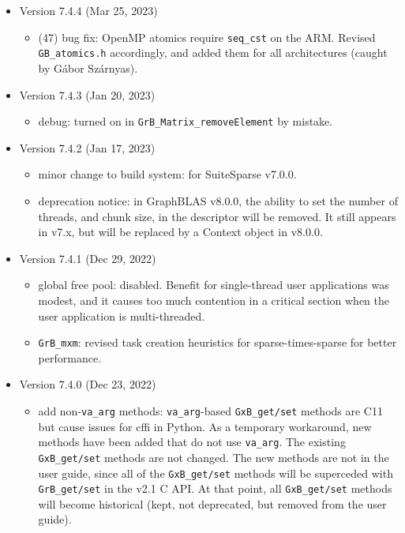 \begin{itemize}
\item Version 7.4.4 (Mar 25, 2023)

    \begin{itemize}
    \item (47) bug fix: OpenMP atomics require \verb'seq_cst' on the ARM.
        Revised \verb'GB_atomics.h' accordingly, and added them for all
        architectures (caught by G{\'{a}}bor Sz{\'{a}}rnyas).
    \end{itemize}

\item Version 7.4.3 (Jan 20, 2023)

    \begin{itemize}
    \item debug: turned on in \verb'GrB_Matrix_removeElement' by mistake.
    \end{itemize}

\item Version 7.4.2 (Jan 17, 2023)

    \begin{itemize}
    \item minor change to build system: for SuiteSparse v7.0.0.
    \item deprecation notice:  in GraphBLAS v8.0.0, the ability to set the
        number of threads, and chunk size, in the descriptor will be removed.
        It still appears in v7.x, but will be replaced by a Context object
        in v8.0.0.
    \end{itemize}

\item Version 7.4.1 (Dec 29, 2022)

    \begin{itemize}
    \item global free pool: disabled.  Benefit for single-thread user
        applications was modest, and it causes too much contention in a
        critical section when the user application is multi-threaded.
    \item \verb'GrB_mxm': revised task creation heuristics for
        sparse-times-sparse for better performance.
    \end{itemize}

\item Version 7.4.0 (Dec 23, 2022)

    \begin{itemize}
    \item add non-\verb'va_arg' methods: \verb'va_arg'-based \verb'GxB_get/set'
        methods are C11 but cause issues for cffi in Python.  As a
        temporary workaround, new methods have been added that do not use
        \verb'va_arg'.  The existing \verb'GxB_get/set' methods are not
        changed.  The new methods are not in the user guide, since all of the
        \verb'GxB_get/set' methods will be superceded with \verb'GrB_get/set'
        in the v2.1 C API.  At that point, all \verb'GxB_get/set' methods will
        become historical (kept, not deprecated, but removed from the user
        guide).
    \end{itemize}


\end{itemize}
